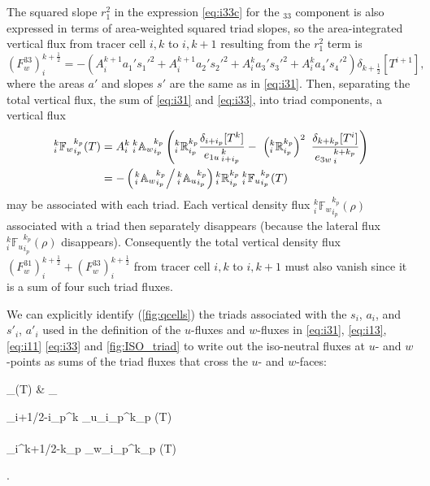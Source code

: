 \documentclass[../main/NEMO_manual]{subfiles}
\begin{document}
The squared slope $r_1^2$ in the expression \autoref{eq:i33c} for the $_{33}$ component is also expressed in
terms of area-weighted squared triad slopes,
so the area-integrated vertical flux from tracer cell $i,k$ to $i,k+1$ resulting from the $r_1^2$ term is
\begin{equation}
  \label{eq:i33}
  \left( F_w^{33} \right) _i^{k+\frac{1}{2}} =
  - \left( {A}_i^{k+1} a_{1}' s_{1}'^2
    + {A}_i^{k+1} a_{2}' s_{2}'^2
    + {A}_i^k a_{3}' s_{3}'^2
    + {A}_i^k a_{4}' s_{4}'^2 \right)\delta_{k+\frac{1}{2}} \left[ T^{i+1} \right],
\end{equation}
where the areas $a'$ and slopes $s'$ are the same as in \autoref{eq:i31}.
Then, separating the total vertical flux, the sum of \autoref{eq:i31} and \autoref{eq:i33},
into triad components, a vertical flux
\begin{align}
  \label{eq:vertflux-triad}
  _i^k {\mathbb{F}_w}_{i_p}^{k_p} (T)
  &= {A}_i^k{\: }_i^k{\mathbb{A}_w}_{i_p}^{k_p}
    \left(
    {_i^k\mathbb{R}_{i_p}^{k_p}}\frac{ \delta_{i+ i_p}[T^k] }{ {e_{1u}}_{\,i + i_p}^{\,k} }
    -\ \left({_i^k\mathbb{R}_{i_p}^{k_p}}\right)^2 \
    \frac{ \delta_{k+k_p} [T^i] }{{e_{3w}}_{\,i}^{\,k+k_p} }
    \right) \\
  &= - \left(\left.{ }_i^k{\mathbb{A}_w}_{i_p}^{k_p}\right/{ }_i^k{\mathbb{A}_u}_{i_p}^{k_p}\right)
    {_i^k\mathbb{R}_{i_p}^{k_p}}{\: }_i^k{\mathbb{F}_u}_{i_p}^{k_p} (T) \label{eq:vertflux-triad2}
\end{align}
may be associated with each triad.
Each vertical density flux $_i^k {\mathbb{F}_w}_{i_p}^{k_p} (\rho)$ associated with a triad then
separately disappears (because the lateral flux $_i^k{\mathbb{F}_u}_{i_p}^{k_p} (\rho)$ disappears).
Consequently the total vertical density flux
$\left( F_w^{31} \right)_i ^{k+\frac{1}{2}} + \left( F_w^{33} \right)_i^{k+\frac{1}{2}}$ from
tracer cell $i,k$ to $i,k+1$ must also vanish since it is a sum of four such triad fluxes.

We can explicitly identify (\autoref{fig:qcells}) the triads associated with the $s_i$, $a_i$,
and $s'_i$, $a'_i$ used in the definition of the $u$-fluxes and $w$-fluxes in \autoref{eq:i31},
\autoref{eq:i13}, \autoref{eq:i11} \autoref{eq:i33} and \autoref{fig:ISO_triad} to write out
the iso-neutral fluxes at $u$- and $w$-points as sums of the triad fluxes that cross the $u$- and $w$-faces:
\begin{flalign}
  \label{eq:iso_flux} _{}(T) &\equiv
  \sum_{}
  \begin{pmatrix}
    {_{i+1/2-i_p}^k {_u}_{i_p}^{k_p} } (T) \\ \\
    {_i^{k+1/2-k_p} {\mathbb{F}_w}_{i_p}^{k_p} } (T) \\
  \end{pmatrix}.
\end{flalign}
\end{document}

